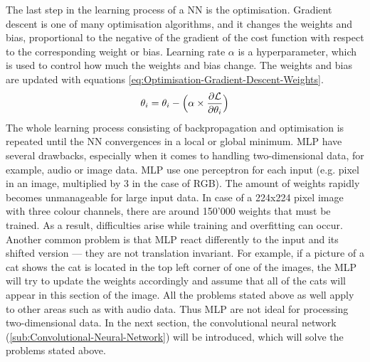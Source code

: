 The last step in the learning process of a \gls{NN} is the optimisation. Gradient descent is one of many optimisation algorithms, and it changes the weights and bias, proportional to the negative of the gradient of the cost function with respect to the corresponding weight or bias. Learning rate $\alpha$ is a hyperparameter, which is used to control how much the weights and bias change. The weights and bias are updated with equations \ref{eq:Optimisation-Gradient-Descent-Weights}.
\begin{equation}
    \centering
    \theta_i = \theta_i - \Big(\alpha \times \frac{\partial \mathcal{L}}{\partial\theta_i}\Big)
    \label{eq:Optimisation-Gradient-Descent-Weights}
\end{equation}
The whole learning process consisting of backpropagation and optimisation is repeated until the \gls{NN} convergences in a local or global minimum.
\newline
\newline
\gls{MLP} have several drawbacks, especially when it comes to handling two-dimensional data, for example, audio or image data. \gls{MLP} use one perceptron for each input (e.g. pixel in an image, multiplied by 3 in the case of RGB). The amount of weights rapidly becomes unmanageable for large input data. In case of a 224x224 pixel image with three colour channels, there are around 150'000 weights that must be trained. As a result, difficulties arise while training and overfitting can occur. Another common problem is that \gls{MLP} react differently to the input and its shifted version — they are not translation invariant. For example, if a picture of a cat shows the cat is located in the top left corner of one of the images, the \gls{MLP} will try to update the weights accordingly and assume that all of the cats will appear in this section of the image. All the problems stated above as well apply to other areas such as with audio data. Thus \gls{MLP} are not ideal for processing two-dimensional data. In the next section, the convolutional neural network (\ref{sub:Convolutional-Neural-Network}) will be introduced, which will solve the problems stated above.

